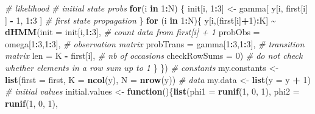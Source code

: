\documentclass[
  12pt,
]{krantz}
\newenvironment{Shaded}{\begin{snugshade}}{\end{snugshade}}
\newcommand{\AttributeTok}[1]{\textcolor[rgb]{0.13,0.29,0.53}{#1}}
\newcommand{\CommentTok}[1]{\textcolor[rgb]{0.56,0.35,0.01}{\textit{#1}}}
\newcommand{\ControlFlowTok}[1]{\textcolor[rgb]{0.13,0.29,0.53}{\textbf{#1}}}
\newcommand{\DecValTok}[1]{\textcolor[rgb]{0.00,0.00,0.81}{#1}}
\newcommand{\FunctionTok}[1]{\textcolor[rgb]{0.13,0.29,0.53}{\textbf{#1}}}
\newcommand{\NormalTok}[1]{#1}
\newcommand{\OtherTok}[1]{\textcolor[rgb]{0.56,0.35,0.01}{#1}}
\newcommand{\SpecialCharTok}[1]{\textcolor[rgb]{0.81,0.36,0.00}{\textbf{#1}}}
\begin{document}
\begin{Shaded}
\begin{Highlighting}[]
  \CommentTok{\# likelihood }
  \CommentTok{\# initial state probs}
  \ControlFlowTok{for}\NormalTok{(i }\ControlFlowTok{in} \DecValTok{1}\SpecialCharTok{:}\NormalTok{N) \{}
\NormalTok{    init[i, }\DecValTok{1}\SpecialCharTok{:}\DecValTok{3}\NormalTok{] }\OtherTok{\textless{}{-}}\NormalTok{ gamma[ y[i, first[i] ] }\SpecialCharTok{{-}} \DecValTok{1}\NormalTok{, }\DecValTok{1}\SpecialCharTok{:}\DecValTok{3}\NormalTok{ ] }\CommentTok{\# first state propagation}
\NormalTok{  \}}
  \ControlFlowTok{for}\NormalTok{ (i }\ControlFlowTok{in} \DecValTok{1}\SpecialCharTok{:}\NormalTok{N)\{}
\NormalTok{    y[i,(first[i]}\SpecialCharTok{+}\DecValTok{1}\NormalTok{)}\SpecialCharTok{:}\NormalTok{K] }\SpecialCharTok{\textasciitilde{}} \FunctionTok{dHMM}\NormalTok{(}\AttributeTok{init =}\NormalTok{ init[i,}\DecValTok{1}\SpecialCharTok{:}\DecValTok{3}\NormalTok{],  }\CommentTok{\# count data from first[i] + 1}
                               \AttributeTok{probObs =}\NormalTok{ omega[}\DecValTok{1}\SpecialCharTok{:}\DecValTok{3}\NormalTok{,}\DecValTok{1}\SpecialCharTok{:}\DecValTok{3}\NormalTok{],     }\CommentTok{\# observation matrix}
                               \AttributeTok{probTrans =}\NormalTok{ gamma[}\DecValTok{1}\SpecialCharTok{:}\DecValTok{3}\NormalTok{,}\DecValTok{1}\SpecialCharTok{:}\DecValTok{3}\NormalTok{],   }\CommentTok{\# transition matrix}
                               \AttributeTok{len =}\NormalTok{ K }\SpecialCharTok{{-}}\NormalTok{ first[i],           }\CommentTok{\# nb of occasions}
                               \AttributeTok{checkRowSums =} \DecValTok{0}\NormalTok{)             }\CommentTok{\# do not check whether elements in a row sum up to 1}
\NormalTok{  \}}
\NormalTok{\})}
\CommentTok{\# constants}
\NormalTok{my.constants }\OtherTok{\textless{}{-}} \FunctionTok{list}\NormalTok{(}\AttributeTok{first =}\NormalTok{ first, }
                     \AttributeTok{K =} \FunctionTok{ncol}\NormalTok{(y), }
                     \AttributeTok{N =} \FunctionTok{nrow}\NormalTok{(y))}
\CommentTok{\# data}
\NormalTok{my.data }\OtherTok{\textless{}{-}} \FunctionTok{list}\NormalTok{(}\AttributeTok{y =}\NormalTok{ y }\SpecialCharTok{+} \DecValTok{1}\NormalTok{)}
\CommentTok{\# initial values }
\NormalTok{initial.values }\OtherTok{\textless{}{-}} \ControlFlowTok{function}\NormalTok{()\{}\FunctionTok{list}\NormalTok{(}\AttributeTok{phi1 =} \FunctionTok{runif}\NormalTok{(}\DecValTok{1}\NormalTok{, }\DecValTok{0}\NormalTok{, }\DecValTok{1}\NormalTok{), }
                                  \AttributeTok{phi2 =} \FunctionTok{runif}\NormalTok{(}\DecValTok{1}\NormalTok{, }\DecValTok{0}\NormalTok{, }\DecValTok{1}\NormalTok{), }

\end{Highlighting}
\end{Shaded}
\end{document}
